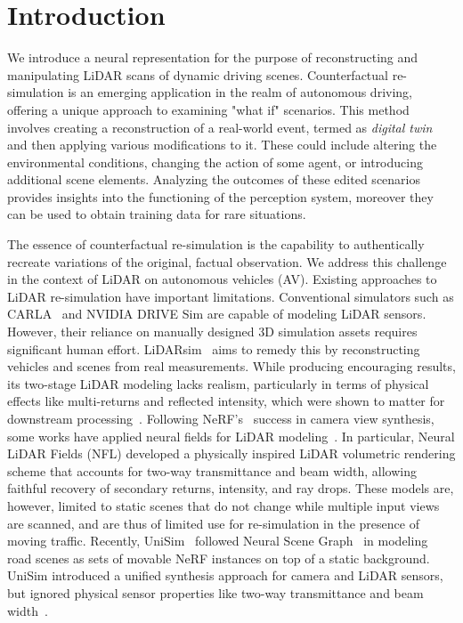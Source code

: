 \section{Introduction}
We introduce a neural representation for the purpose of reconstructing and manipulating LiDAR scans of dynamic driving scenes. 
Counterfactual re-simulation is an emerging application in the realm of autonomous driving, offering a unique approach to examining "what if" scenarios. This method involves creating a reconstruction of a real-world event, termed as \textit{digital twin} and then applying various modifications to it. These could include altering the environmental conditions, changing the action of some agent, or introducing additional scene elements. Analyzing the outcomes of these edited scenarios provides insights into the functioning of the perception system, moreover they can be used to obtain training data for rare situations.

The essence of counterfactual re-simulation is the capability to authentically recreate variations of the original, factual observation. We address this challenge in the context of LiDAR on autonomous vehicles (AV). Existing approaches to LiDAR re-simulation have important limitations. Conventional simulators such as CARLA~\cite{dosovitskiy2017carla} and NVIDIA DRIVE Sim are capable of modeling LiDAR sensors. However, their reliance on manually designed 3D simulation assets requires significant human effort. LiDARsim~\cite{manivasagam2020lidarsim} aims to remedy this by reconstructing vehicles and scenes from real measurements. While producing encouraging results, its two-stage LiDAR modeling lacks realism, particularly in terms of physical effects like multi-returns and reflected intensity, which were shown 
 to matter for downstream processing~\cite{guillard2022learning}. Following NeRF's~\cite{mildenhall2020nerf} success in camera view synthesis, some works have applied neural fields for LiDAR modeling~\cite{Huang2023nfl, tao2023lidar, zhang2023nerf}. In particular, Neural LiDAR Fields (NFL)\cite{Huang2023nfl} developed a physically inspired LiDAR volumetric rendering scheme that accounts for two-way transmittance and beam width, allowing faithful recovery of secondary returns, intensity, and ray drops. These models are, however, limited to static scenes that do not change while multiple input views are scanned, and are thus of limited use for re-simulation in the presence of moving traffic. Recently, UniSim~\cite{yang2023unisim} followed Neural Scene Graph~\cite{Ost_2021_CVPR} in modeling road scenes as sets of movable NeRF instances on top of a static background. UniSim introduced a unified synthesis approach for camera and LiDAR sensors, but ignored physical sensor properties like two-way transmittance and beam width~\cite{Huang2023nfl}.

